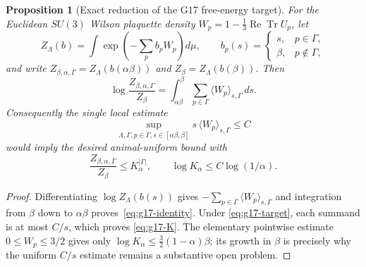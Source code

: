 \documentclass[11pt]{article}
\theoremstyle{plain}
\newtheorem{proposition}[theorem]{Proposition}
\theoremstyle{definition}
\theoremstyle{remark}
\begin{document}
\begin{proposition}[Exact reduction of the G17 free-energy target]
\label{prop:g17-reduction}
For the Euclidean $SU(3)$ Wilson plaquette density
$W_p=1-\frac13\operatorname{Re}\operatorname{Tr}U_p$, let
\[
 Z_\Lambda(b)=\int
 \exp\!\left(-\sum_p b_pW_p\right)d\mu,
 \qquad
 b_p(s)=\begin{cases}s,&p\in\Gamma,\\ \beta,&p\notin\Gamma,
 \end{cases}
\]
and write $Z_{\beta,\alpha,\Gamma}=Z_\Lambda(b(\alpha\beta))$ and
$Z_\beta=Z_\Lambda(b(\beta))$. Then
\begin{equation}\label{eq:g17-identity}
 \log\frac{Z_{\beta,\alpha,\Gamma}}{Z_\beta}
 =\int_{\alpha\beta}^{\beta}
   \sum_{p\in\Gamma}\langle W_p\rangle_{s,\Gamma}\,ds .
\end{equation}
Consequently the single local estimate
\begin{equation}\label{eq:g17-target}
 \sup_{\Lambda,\Gamma,p\in\Gamma,
 s\in[\alpha\beta,\beta]}
 s\,\langle W_p\rangle_{s,\Gamma}\le C
\end{equation}
would imply the desired animal-uniform bound with
\begin{equation}\label{eq:g17-K}
 \frac{Z_{\beta,\alpha,\Gamma}}{Z_\beta}
 \le K_\alpha^{|\Gamma|},
 \qquad \log K_\alpha\le C\log(1/\alpha).
\end{equation}
\end{proposition}

\begin{proof}
Differentiating $\log Z_\Lambda(b(s))$ gives
$-\sum_{p\in\Gamma}\langle W_p\rangle_{s,\Gamma}$ and integration from
$\beta$ down to $\alpha\beta$ proves~\eqref{eq:g17-identity}. Under
\eqref{eq:g17-target}, each summand is at most $C/s$, which proves
\eqref{eq:g17-K}. The elementary pointwise estimate
$0\le W_p\le3/2$ gives only
$\log K_\alpha\le\frac32(1-\alpha)\beta$; its growth in $\beta$ is precisely
why the uniform $C/s$ estimate remains a substantive open problem.
\end{proof}
\end{document}
